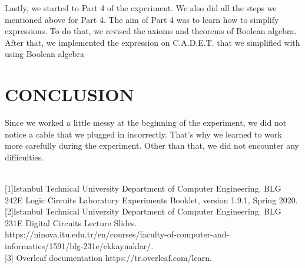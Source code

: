 \documentclass[pdftex,12pt,a4paper]{article}
\begin{document}
Lastly, we started to Part 4 of the experiment. We also did all the steps we mentioned above for Part 4. The aim of Part 4 was to learn how to simplify expressions. To do that, we revised the axioms and theorems of Boolean algebra. After that, we implemented the expression on C.A.D.E.T. that we simplified with using Boolean algebra

\section{CONCLUSION}
Since we worked a little messy at the beginning of the experiment, we did not notice a cable that we plugged in incorrectly. That's why we learned to work more carefully during the experiment. Other than that, we did not encounter any difficulties.


\newpage
{}


\\

[1]Istanbul Technical University Department of Computer Engineering. BLG 242E Logic Circuits Laboratory Experiments Booklet, version 1.9.1, Spring 2020.\\

[2]Istanbul Technical University Department of Computer Engineering. BLG 231E Digital Circuits Lecture Slides. https://ninova.itu.edu.tr/en/courses/faculty-of-computer-and-informatics/1591/blg-231e/ekkaynaklar/.\\

[3] Overleaf documentation https://tr.overleaf.com/learn.
\end{document}
